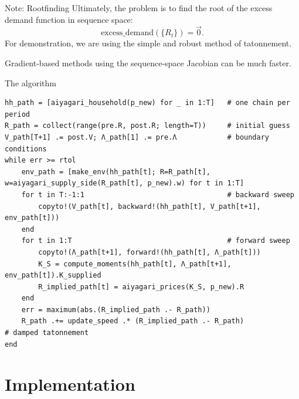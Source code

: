 \documentclass[10pt,aspectratio=169]{beamer}
\begin{document}
\begin{frame}{Note: Rootfinding}
  Ultimately, the problem is to find the root of the excess demand function in sequence space:
  \[
    \text{excess\_demand}(\{R_t\}) = \vec{0}.
  \]
  For demonstration, we are using the simple and robust method of tatonnement.

  Gradient-based methods using the sequence-space Jacobian can be much faster.
\end{frame}

\begin{frame}[fragile]{The algorithm}
\begin{lstlisting}[basicstyle=\ttfamily\scriptsize]
hh_path = [aiyagari_household(p_new) for _ in 1:T]   # one chain per period
R_path = collect(range(pre.R, post.R; length=T))     # initial guess
V_path[T+1] .= post.V; Λ_path[1] .= pre.Λ            # boundary conditions
while err >= rtol
    env_path = [make_env(hh_path[t]; R=R_path[t], w=aiyagari_supply_side(R_path[t], p_new).w) for t in 1:T]
    for t in T:-1:1                                  # backward sweep
        copyto!(V_path[t], backward!(hh_path[t], V_path[t+1], env_path[t]))
    end
    for t in 1:T                                     # forward sweep
        copyto!(Λ_path[t+1], forward!(hh_path[t], Λ_path[t]))
        K_S = compute_moments(hh_path[t], Λ_path[t+1], env_path[t]).K_supplied
        R_implied_path[t] = aiyagari_prices(K_S, p_new).R
    end
    err = maximum(abs.(R_implied_path .- R_path))
    R_path .+= update_speed .* (R_implied_path .- R_path)                  # damped tatonnement
end
\end{lstlisting}
\end{frame}

\section[Implementation]{Implementation}
\end{document}
